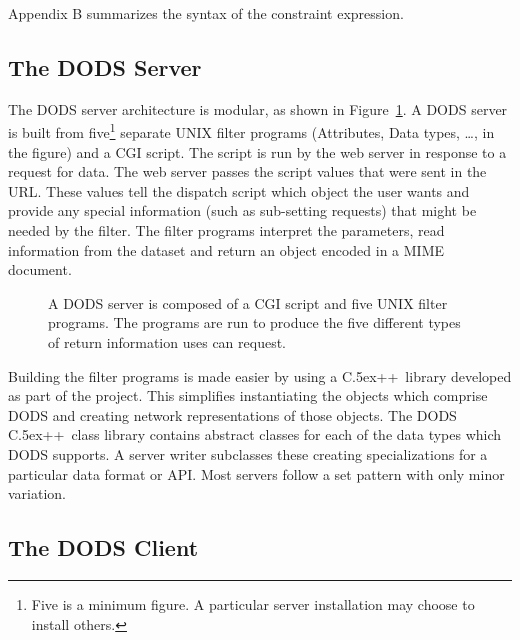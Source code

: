 \documentclass{article}
\newcommand{\Cpp}{{\rm {\small C}\raise.5ex\hbox{\footnotesize ++}}}
\begin{document}
Appendix B summarizes the syntax of the constraint expression.

\subsection{The DODS Server}
\label{servers}


The \ac{DODS} server architecture is modular, as shown in
Figure~\ref{fig:server-arch}.  A \ac{DODS} server is built from
five\footnote{Five is a minimum figure.  A particular server installation may
  choose to install others.} separate UNIX filter programs (Attributes, Data
types, \ldots, in the figure) and a \ac{CGI} script.  The script is run by
the web server in response to a request for data. The web server passes the
script values that were sent in the \acs{URL}. These values tell the dispatch
script which object the user wants and provide any special information (such
as sub-setting requests) that might be needed by the filter. The filter
programs interpret the parameters, read information from the dataset and
return an object encoded in a \acs{MIME} document.

\begin{figure}[htbp]
\begin{center}
\caption{A DODS server is composed of a CGI script and five UNIX
  filter  programs. The programs are run to produce the five different types of
  return information uses can request.}
\label{fig:server-arch}
\end{center}
\end{figure}

Building the filter programs is made easier by using a \Cpp\ library developed
as part of the project. This simplifies instantiating the objects which
comprise \ac{DODS} and creating network representations of those objects. The
\ac{DODS} \Cpp\ class library contains abstract classes for each of the data
types which \ac{DODS} supports. A server writer subclasses these creating
specializations for a particular data format or \ac{API}. Most servers follow
a set pattern with only minor variation.

\subsection{The DODS Client}
\label{clients}
\end{document}
